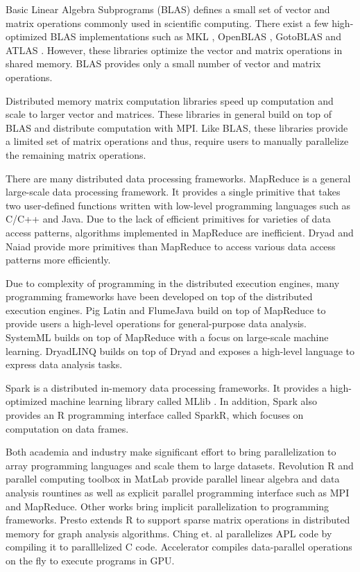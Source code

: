 Basic Linear Algebra Subprograms (BLAS) defines a small set of vector and
matrix operations commonly used in scientific computing. There exist a few
high-optimized BLAS implementations such as MKL \cite{mkl}, OpenBLAS
\cite{openblas}, GotoBLAS \cite{Goto} and ATLAS \cite{atlas}. However, these
libraries optimize the vector and matrix operations in shared memory. BLAS
provides only a small number of vector and matrix operations.

Distributed memory matrix computation libraries \cite{trilinos, petsc, elemental}
speed up computation and scale to larger vector and matrices. These libraries
in general build on top of BLAS and distribute computation with MPI. Like BLAS,
these libraries provide a limited set of matrix operations and thus, require users
to manually parallelize the remaining matrix operations.

There are many distributed data processing frameworks.
MapReduce \cite{mapreduce} is a general large-scale data processing framework.
It provides a single primitive that takes two user-defined functions written with
low-level programming languages such as C/C++ and Java. Due to the lack of
efficient primitives for varieties of data access patterns, algorithms
implemented in MapReduce are inefficient. Dryad \cite{dryad} and
Naiad \cite{naiad} provide more primitives than MapReduce to access various
data access patterns more efficiently.

Due to complexity of programming in the distributed execution engines, many
programming frameworks have been developed on top of the distributed execution
engines. Pig Latin \cite{pig} and FlumeJava \cite{flumejava} build
on top of MapReduce to provide users a high-level operations for
general-purpose data analysis. SystemML \cite{systemml} builds
on top of MapReduce with a focus on large-scale machine learning.
DryadLINQ \cite{dryadlinq} builds on top of Dryad and exposes a high-level
language to express data analysis tasks.

Spark \cite{spark} is a distributed in-memory data processing frameworks.
It provides a high-optimized machine learning library called MLlib \cite{mllib}.
In addition, Spark also provides an R programming interface called SparkR, which
focuses on computation on data frames.

Both academia and industry make significant effort to bring parallelization to
array programming languages and scale them to large datasets. Revolution R
\cite{rre} and parallel computing toolbox in MatLab \cite{matlab} provide
parallel linear algebra and data analysis rountines as well as explicit
parallel programming interface such as MPI and MapReduce. Other works bring
implicit parallelization to programming frameworks. Presto \cite{presto}
extends R to support sparse matrix operations in distributed memory for graph
analysis algorithms. Ching et. al \cite{Ching12} parallelizes APL code by
compiling it to paralllelized C code. Accelerator \cite{accelerator} compiles
data-parallel operations on the fly to execute programs in GPU.
